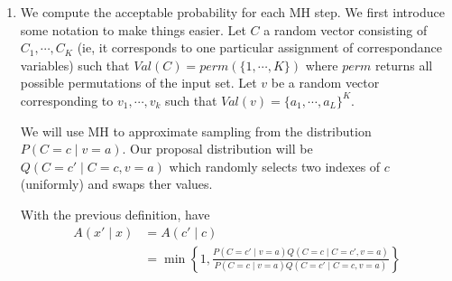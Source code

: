 \documentclass[12pt]{article}
\begin{document}
\begin{enumerate}[label=(\alph*)]
  \item We compute the acceptable probability for each MH step. We first introduce some notation to make things easier. Let $C$ a random vector consisting of $C_1, \cdots, C_K$ (ie, it corresponds to one particular assignment of correspondance variables) such that $Val(C) = perm(\{1,\cdots, K\})$ where $perm$ returns all possible permutations of the input set. Let $v$ be a random vector corresponding to $v_1, \cdots, v_k$ such that $Val(v) = \{a_1, \cdots, a_L\}^K$.

  We will use MH to approximate sampling from the distribution $P(C = c\mid v = a)$. Our proposal distribution will be $Q(C = c' \mid C = c, v = a)$ which randomly selects two indexes of $c$ (uniformly) and swaps ther values.

  With the previous definition, have
  \begin{align*}
  	A(x' \mid x) &= A(c' \mid c) \\
  	&= \min \left\{1, \frac{P(C = c' \mid v = a)Q(C = c \mid C = c', v = a)}{P(C = c \mid v = a)Q(C = c' \mid C = c, v = a)} \right\}
  \end{align*}


\end{enumerate}
\end{document}
